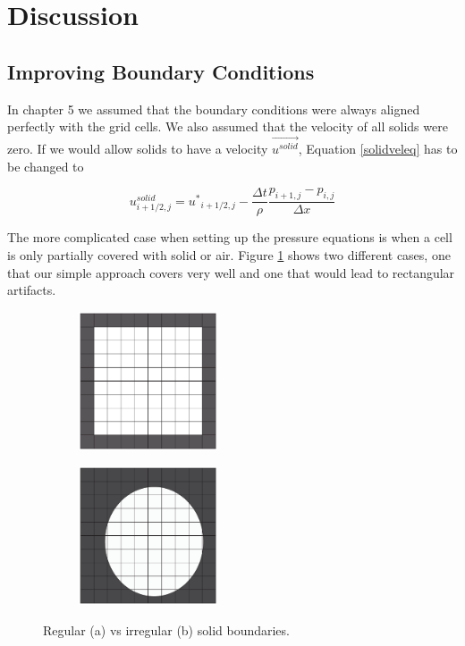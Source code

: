 \section{Discussion}
\subsection{Improving Boundary Conditions}
In chapter 5 we assumed that the boundary conditions were always aligned perfectly with the grid cells. We also assumed that the velocity of all solids were zero. If we would allow solids to have a velocity $\vec{u^{solid}}$, Equation \ref{solidveleq} has to be changed to

\begin{equation}
u^{solid}_{i+1/2,j}  = {u^*}_{i+1/2,j} - \frac{\Delta t }{\rho}\frac{p_{i+1,j} - p_{i,j}}{\Delta x}
\end{equation}

The more complicated case when setting up the pressure equations is when a cell is only partially covered with solid or air. Figure \ref{boundarycases} shows two different cases, one that our simple approach covers very well and one that would lead to rectangular artifacts.

\begin{figure}[ht!]
\centering
\begin{subfigure}[]{}
\includegraphics[height=41mm]{img/boundary1.pdf}
\end{subfigure}
\begin{subfigure}[]{}
\includegraphics[height=41mm]{img/boundary2.pdf}
\end{subfigure}
\caption{Regular (a) vs irregular (b) solid boundaries.}
\label{boundarycases}
\end{figure}

